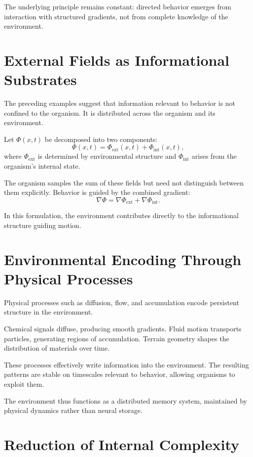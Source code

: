 \documentclass[11pt,oneside]{book}
\begin{document}
The underlying principle remains constant: directed behavior emerges from interaction with structured gradients, not from complete knowledge of the environment.

\section{External Fields as Informational Substrates}

The preceding examples suggest that information relevant to behavior is not confined to the organism. It is distributed across the organism and its environment.

Let $\Phi(x,t)$ be decomposed into two components:
\[
\Phi(x,t) = \Phi_{\mathrm{ext}}(x,t) + \Phi_{\mathrm{int}}(x,t),
\]
where $\Phi_{\mathrm{ext}}$ is determined by environmental structure and $\Phi_{\mathrm{int}}$ arises from the organism’s internal state.

The organism samples the sum of these fields but need not distinguish between them explicitly. Behavior is guided by the combined gradient:
\[
\nabla \Phi = \nabla \Phi_{\mathrm{ext}} + \nabla \Phi_{\mathrm{int}}.
\]

In this formulation, the environment contributes directly to the informational structure guiding motion.

\section{Environmental Encoding Through Physical Processes}

Physical processes such as diffusion, flow, and accumulation encode persistent structure in the environment.

Chemical signals diffuse, producing smooth gradients. Fluid motion transports particles, generating regions of accumulation. Terrain geometry shapes the distribution of materials over time.

These processes effectively write information into the environment. The resulting patterns are stable on timescales relevant to behavior, allowing organisms to exploit them.

The environment thus functions as a distributed memory system, maintained by physical dynamics rather than neural storage.

\section{Reduction of Internal Complexity}
\end{document}
